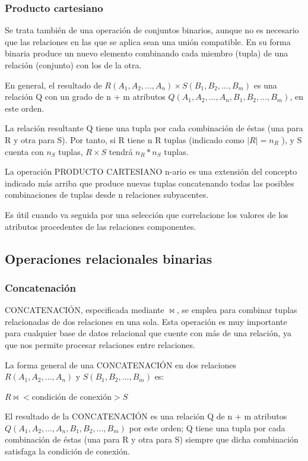 \subsubsection*{Producto cartesiano}

Se trata también de una operación de conjuntos binarios, aunque no es necesario que las relaciones en las que se aplica sean una unión compatible. En su forma binaria produce un nuevo elemento combinando cada miembro (tupla) de una relación (conjunto) con los de la otra.


En general, el resultado de $R(A_1, A_2,...,A_n) \times S(B_1, B_2,..., B_m)$ es una relación Q con un grado de n + m atributos $Q(A_1, A_2,..., A_n, B_1, B_2,..., B_m)$, en este orden.


La relación resultante Q tiene una tupla por cada combinación de éstas (una para R y otra para S). Por tanto, si R tiene n R tuplas (indicado como $|R| = n_R$ ), y S cuenta con $n_S$ tuplas, $R \times S$ tendrá $n_R \ast	 n_S$ tuplas.


La operación PRODUCTO CARTESIANO n-ario es una extensión del concepto indicado más arriba que produce nuevas tuplas concatenando todas las posibles combinaciones de tuplas desde n relaciones subyacentes.


Es útil cuando va seguida por una selección que correlacione los valores de los atributos procedentes de las relaciones componentes.

\subsection*{Operaciones relacionales binarias}
\subsubsection*{Concatenación}
CONCATENACIÓN, especificada mediante $\bowtie $, se emplea para combinar tuplas relacionadas de dos relaciones en una sola. Esta operación es muy importante para cualquier base de datos relacional que cuente con más de una relación, ya que nos permite procesar relaciones entre relaciones.


La forma general de una CONCATENACIÓN en dos relaciones $R(A_1, A_2,...,A_n)$ y $S(B_1, B_2,..., B_m)$ es:


$R\bowtie<$condición de conexión$> S$

El resultado de la CONCATENACIÓN es una relación Q de n + m atributos $Q(A_1, A_2,..., A_n, B_1, B_2,..., B_m)$ por este orden; Q tiene una tupla por cada combinación de éstas (una para R y otra para S) siempre que dicha combinación satisfaga la condición de conexión.


